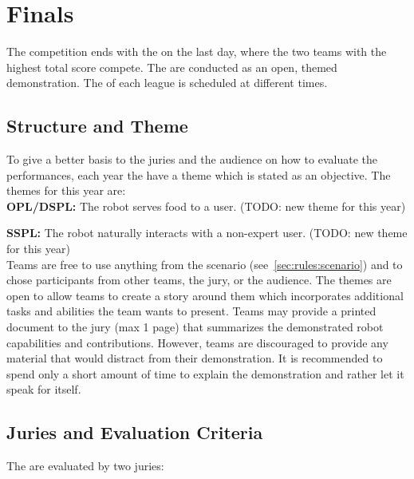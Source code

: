 \chapter{Finals}
\label{chap:finals}
\raggedbottom
The competition ends with the \FINAL{} on the last day, where the two teams with the highest total score compete. The \FINAL{} are conducted as an open, themed demonstration. The \FINAL{} of each league is scheduled at different times.

\section{Structure and Theme}
\label{sec:finals:theme}

To give a better basis to the juries and the audience on how to evaluate the performances, each year the \FINAL{} have a theme which is stated as an objective. The themes for this year are: \\

\textbf{OPL/DSPL:} The robot serves food to a user. (TODO: new theme for this year)

\textbf{SSPL:} The robot naturally interacts with a non-expert user. (TODO: new theme for this year) \\

\noindent Teams are free to use anything from the \AtHome{} scenario (see~\ref{sec:rules:scenario}) and to chose participants from other teams, the jury, or the audience. The themes are open to allow teams to create a story around them which incorporates additional tasks and abilities the team wants to present. Teams may provide a printed document to the jury (max 1 page) that summarizes the demonstrated robot capabilities and contributions. However, teams are discouraged to provide any material that would distract from their demonstration. It is recommended to spend only a short amount of time to explain the demonstration and rather let it speak for itself.


\section{Juries and Evaluation Criteria}
\label{sec:finals:juries}
The  are evaluated by two juries:

